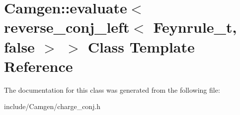 \hypertarget{a00184}{}\section{Camgen\+:\+:evaluate$<$ reverse\+\_\+conj\+\_\+left$<$ Feynrule\+\_\+t, false $>$ $>$ Class Template Reference}
\label{a00184}


The documentation for this class was generated from the following file\+:\begin{DoxyCompactItemize}
\item 
include/\+Camgen/charge\+\_\+conj.\+h\end{DoxyCompactItemize}
